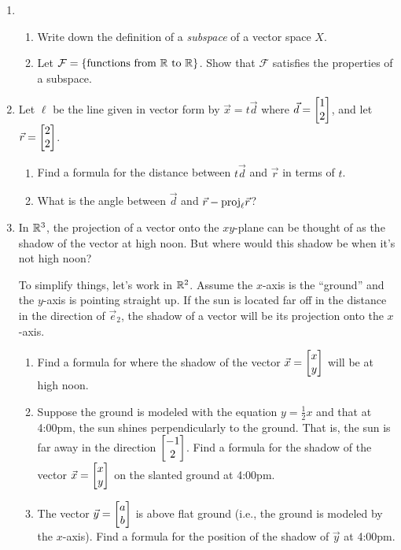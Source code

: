 \begin{enumerate}
	\item \begin{enumerate}
		\item Write down the definition of a \emph{subspace} of a vector space $X$.
		\item Let $\mathcal F=\{\text{functions from $\mathbb{R}$ to $\mathbb{R}$}\}$. Show that $\mathcal F$ satisfies the properties of a subspace.
	\end{enumerate}


	\item Let $\ell$ be the line given in vector form by $\vec x=t\vec d$ where $\vec d=\begin{bmatrix}1\\2\end{bmatrix}$, and let $\vec r=\begin{bmatrix}2\\2\end{bmatrix}$.
		\begin{enumerate}
			\item Find a formula for the distance between $t\vec d$ and $\vec r$ in terms of $t$.
			\item What is the angle between $\vec d$ and $\vec r-\mathrm{proj}_\ell \vec r$?
		\end{enumerate}

	\item In $\mathbb{R}^3$, the projection of a vector onto the $xy$-plane can be thought of as the shadow
		of the vector at high noon. But where would this shadow be when it's not high noon?\

		To simplify things, let's work in $\mathbb{R}^2$. Assume the $x$-axis is the ``ground'' and the $y$-axis is
		pointing straight up. If the sun is located far off in the distance in the direction of $\vec e_2$,
		the shadow of a vector will be its projection onto the $x$-axis.
		\begin{enumerate}
			\item Find a formula for where the shadow of the vector $\vec x=\begin{bmatrix}x\\y\end{bmatrix}$ will be at high noon.
			\item Suppose the ground is modeled with the equation $y=\tfrac{1}{2}x$ and that at 4:00pm, the sun shines
				perpendicularly to the ground. That is, the sun is far away in the direction $\begin{bmatrix}-1\\2\end{bmatrix}$.
				Find a formula for the shadow of the vector $\vec x=\begin{bmatrix}x\\y\end{bmatrix}$ on the slanted ground at 4:00pm.
			\item The vector $\vec y=\begin{bmatrix}a\\b\end{bmatrix}$ is above flat ground (i.e., the ground is modeled by the $x$-axis).
				Find a formula for the position of the shadow of $\vec y$ at 4:00pm.
		\end{enumerate}

\end{enumerate}
